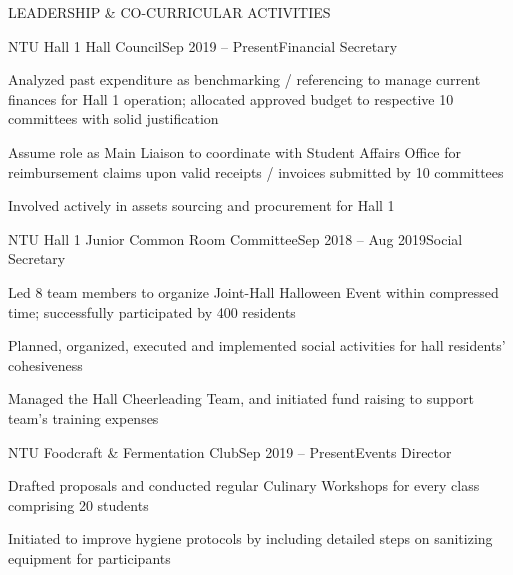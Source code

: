 \documentclass{resume} %
\begin{document}
\begin{rSection}{LEADERSHIP \& CO-CURRICULAR ACTIVITIES}

\begin{rSubsection}{NTU Hall 1 Hall Council}{Sep 2019 – Present}{Financial Secretary}{}
\item Analyzed past expenditure as benchmarking / referencing to manage current finances for Hall 1 operation; allocated approved budget to respective 10 committees with solid justification
\item Assume role as Main Liaison to coordinate with Student Affairs Office for reimbursement claims upon valid receipts / invoices submitted by 10 committees 
\item Involved actively in assets sourcing and procurement for Hall 1

\end{rSubsection}

\begin{rSubsection}{NTU Hall 1 Junior Common Room Committee}{Sep 2018 – Aug 2019}{Social Secretary}{}
\item Led 8 team members to organize Joint-Hall Halloween Event within compressed time; successfully participated by 400 residents
\item Planned, organized, executed and implemented social activities for hall residents’ cohesiveness 
\item Managed the Hall Cheerleading Team, and initiated fund raising to support team's training expenses

\end{rSubsection}

\begin{rSubsection}{NTU Foodcraft \& Fermentation Club}{Sep 2019 – Present}{Events Director}{}
\item Drafted proposals and conducted regular Culinary Workshops for every class comprising 20 students
\item Initiated to improve hygiene protocols by including detailed steps on sanitizing equipment for participants

\end{rSubsection}
    
\end{rSection}

\end{document}
